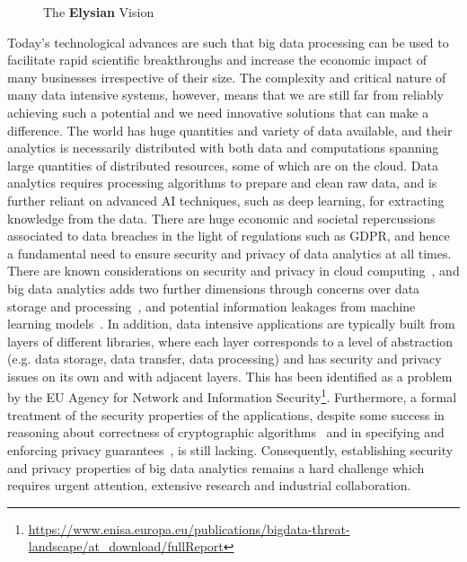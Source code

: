 \documentclass[a4paper,11pt]{article}
\newcommand{\project}[1]{\textbf{#1}\xspace}
\newcommand{\SECURITY}{\project{Elysian}}
\newcommand{\TheProject}{\SECURITY}
\begin{document}
\begin{figure}[tp]
  \begin{center}
  \vspace{-5mm}
  \caption{The \TheProject{} Vision}
  \label{fig:vision}
  \end{center}
  \end{figure}
Today's technological advances are such that big data processing can be used to facilitate rapid scientific breakthroughs and increase the economic impact of many businesses irrespective of their size. The complexity and critical nature of many data intensive systems, however,
means that we are still far from reliably achieving such a potential and we need innovative solutions that can make a difference. The world has huge quantities and variety of
data available, and their analytics is necessarily distributed with both data and computations spanning large quantities of distributed resources, some of which are on  the cloud. 
Data analytics requires processing algorithms to prepare 
and clean raw data, and is further reliant on advanced AI techniques, such as deep learning, for
extracting knowledge from the data.
There are huge economic and societal repercussions associated to data breaches in the light of regulations such as GDPR, and hence a fundamental need to
ensure security and privacy of data analytics at all times.
There are known considerations on security and privacy in cloud computing~\cite{cloudSecurity}, and big data analytics adds two further dimensions through
concerns over data storage and processing~\cite{bigdatasecurity}, and potential information leakages from machine learning models~\cite{mlSecurity}.
In addition, data intensive applications are typically built from layers of different libraries, where each layer corresponds to a level of abstraction (e.g. data storage, data transfer, data processing) and has security and privacy issues on its own and with adjacent layers. This has been identified as a problem by the EU Agency for Network and Information Security\footnote{\url{https://www.enisa.europa.eu/publications/bigdata-threat-landscape/at_download/fullReport}}. Furthermore, a formal treatment of the security properties of the applications, despite some success in reasoning about correctness of cryptographic algorithms~\cite{FM-crypto} and in specifying and enforcing privacy guarantees~\cite{FM-priv-guarantee}, is still lacking. Consequently,
establishing security and privacy properties of big data analytics remains 
a hard challenge which requires urgent attention, extensive research and industrial collaboration.
\end{document}
